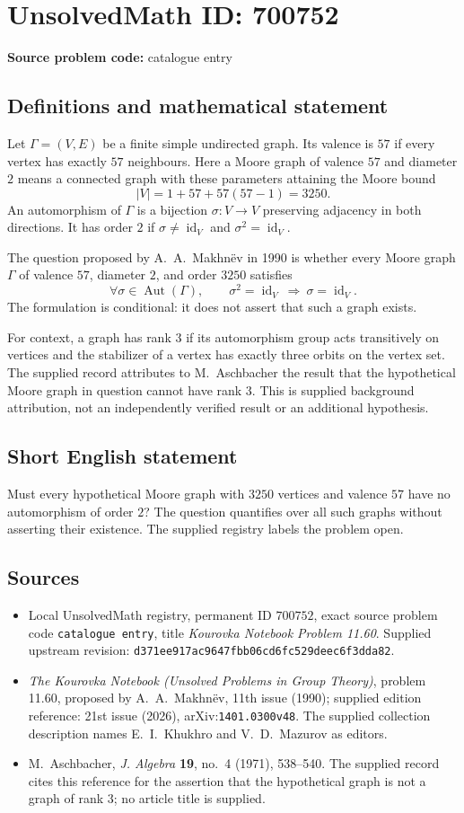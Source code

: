 \documentclass[11pt]{article}
\begin{document}
\section*{UnsolvedMath ID: 700752}
\textbf{Source problem code:} catalogue entry
\subsection{Definitions and mathematical statement}
Let \(\Gamma=(V,E)\) be a finite simple undirected graph. Its valence is \(57\) if every vertex has exactly \(57\) neighbours. Here a Moore graph of valence \(57\) and diameter \(2\) means a connected graph with these parameters attaining the Moore bound
\[
|V|=1+57+57(57-1)=3250.
\]
An automorphism of \(\Gamma\) is a bijection \(\sigma:V\to V\) preserving adjacency in both directions. It has order \(2\) if \(\sigma\ne\operatorname{id}_V\) and \(\sigma^2=\operatorname{id}_V\).

The question proposed by A.~A.~Makhn\"ev in 1990 is whether every Moore graph \(\Gamma\) of valence \(57\), diameter \(2\), and order \(3250\) satisfies
\[
\forall\sigma\in\operatorname{Aut}(\Gamma),\qquad
\sigma^2=\operatorname{id}_V\ \Longrightarrow\ \sigma=\operatorname{id}_V.
\]
The formulation is conditional: it does not assert that such a graph exists.

For context, a graph has rank \(3\) if its automorphism group acts transitively on vertices and the stabilizer of a vertex has exactly three orbits on the vertex set. The supplied record attributes to M.~Aschbacher the result that the hypothetical Moore graph in question cannot have rank \(3\). This is supplied background attribution, not an independently verified result or an additional hypothesis.
\subsection{Short English statement}
Must every hypothetical Moore graph with \(3250\) vertices and valence \(57\) have no automorphism of order \(2\)? The question quantifies over all such graphs without asserting their existence. The supplied registry labels the problem open.
\subsection{Sources}
\begin{itemize}
\item Local UnsolvedMath registry, permanent ID \(700752\), exact source problem code \texttt{catalogue entry}, title \emph{Kourovka Notebook Problem 11.60}. Supplied upstream revision: \texttt{d371ee917ac9647fbb06cd6fc529deec6f3dda82}.
\item \emph{The Kourovka Notebook (Unsolved Problems in Group Theory)}, problem 11.60, proposed by A.~A.~Makhn\"ev, 11th issue (1990); supplied edition reference: 21st issue (2026), arXiv:\texttt{1401.0300v48}. The supplied collection description names E.~I.~Khukhro and V.~D.~Mazurov as editors.
\item M.~Aschbacher, \emph{J. Algebra} \textbf{19}, no.~4 (1971), 538--540. The supplied record cites this reference for the assertion that the hypothetical graph is not a graph of rank \(3\); no article title is supplied.
\end{itemize}
\end{document}
